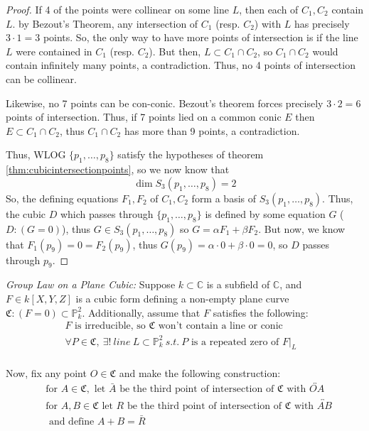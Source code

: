 \begin{proof}
If 4 of the points were collinear on some line $L$, then each of $C_1,C_2$ contain $L$.
by Bezout's Theorem, any intersection of $C_1$ (resp. $C_2$) with $L$ has precisely $3 \cdot 1 = 3$
points. So, the only way to have more points of intersection is if the line $L$ were
contained in $C_1$ (resp. $C_2$).
But then, $L \subset C_1 \cap C_2$, so $C_1 \cap C_2$ would contain infinitely many points,
a contradiction. Thus, no 4 points of intersection can be collinear.

Likewise, no 7 points can be con-conic. Bezout's theorem forces precisely
$3 \cdot 2 = 6$ points of intersection. Thus, if 7 points lied on a common
conic $E$ then $E \subset C_1 \cap C_2$, thus $C_1 \cap C_2$ has more than
9 points, a contradiction.

Thus, WLOG $\{p_1, \dots, p_8\}$ satisfy the hypotheses of theorem \ref{thm:cubicintersectionpoints},
so we now know that 
\[
	\dim S_3(p_1, \dots, p_8) = 2
\]
So, the defining equations $F_1, F_2$ of $C_1, C_2$ form a basis of 
$S_3(p_1, \dots, p_8)$. Thus, the cubic $D$ which passes through
$\{p_1, \dots, p_8\}$ is defined by some equation $G$ ($D:(G=0)$),
thus $G \in S_3(p_1, \dots, p_8)$ so $G = \alpha F_1 + \beta F_2$.
But now, we know that $F_1(p_9) = 0 = F_2(p_9)$, thus
$G(p_9) = \alpha \cdot 0 + \beta \cdot 0 = 0$, so $D$ passes through $p_9$.
\end{proof}


\begin{mydef}
\label{def:ellipticgroup}
\emph{Group Law on a Plane Cubic:}
Suppose $k \subset \mathbb{C}$ is a subfield of $\mathbb{C}$,
and $F \in k[X,Y,Z]$ is a cubic form defining a non-empty plane
curve $\mathfrak{C}:(F=0) \subset \mathbb{P}^2_k$. Additionally, assume that
$F$ satisfies the following:
\begin{align*}
F \text{ is irreducible, so $\mathfrak{C}$ won't contain a line or conic}&\tag{a}\\
\forall P \in \mathfrak{C},~\exists!~line~L \subset \mathbb{P}^2_k~s.t.~ P
\text{ is a repeated zero of } F|_L& \tag{b}\\
\end{align*}

Now, fix any point $O \in \mathfrak{C}$ and make the following construction:
\begin{align*}
&\text{for } A \in \mathfrak{C}, \text{ let } \bar{A} \text{ be the third point of intersection of $\mathfrak{C}$ with $\overleftrightarrow{OA}$} \tag{i}\\
&\text{for } A, B \in \mathfrak{C} \text{ let } R \text{ be the third point of intersection of $\mathfrak{C}$ with $\overleftrightarrow{AB}$}\\
&\text{ and define $A+B = \bar{R}$}\tag{ii}\\
\end{align*}
\end{mydef}

